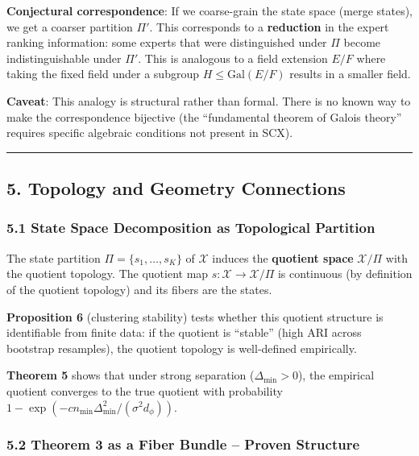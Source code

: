 \documentclass[
  12pt,
]{article}
\begin{document}
\textbf{Conjectural correspondence}: If we coarse-grain the state space
(merge states), we get a coarser partition \(\Pi'\). This corresponds to
a \textbf{reduction} in the expert ranking information: some experts
that were distinguished under \(\Pi\) become indistinguishable under
\(\Pi'\). This is analogous to a field extension \(E/F\) where taking
the fixed field under a subgroup \(H \leq \text{Gal}(E/F)\) results in a
smaller field.

\textbf{Caveat}: This analogy is structural rather than formal. There is
no known way to make the correspondence bijective (the ``fundamental
theorem of Galois theory'' requires specific algebraic conditions not
present in SCX).

\begin{center}\rule{0.5\linewidth}{0.5pt}\end{center}

\subsection{5. Topology and Geometry
Connections}\label{topology-and-geometry-connections}

\subsubsection{5.1 State Space Decomposition as Topological
Partition}\label{state-space-decomposition-as-topological-partition}

The state partition \(\Pi = \{s_1, \dots, s_K\}\) of \(\mathcal{X}\)
induces the \textbf{quotient space} \(\mathcal{X}/\Pi\) with the
quotient topology. The quotient map
\(s: \mathcal{X} \to \mathcal{X}/\Pi\) is continuous (by definition of
the quotient topology) and its fibers are the states.

\textbf{Proposition 6} (clustering stability) tests whether this
quotient structure is identifiable from finite data: if the quotient is
``stable'' (high ARI across bootstrap resamples), the quotient topology
is well-defined empirically.

\textbf{Theorem 5} shows that under strong separation
(\(\Delta_{\min} > 0\)), the empirical quotient converges to the true
quotient with probability
\(1 - \exp(-c n_{\min} \Delta_{\min}^2 / (\sigma^2 d_\phi))\).

\subsubsection{5.2 Theorem 3 as a Fiber Bundle -- Proven
Structure}\label{theorem-3-as-a-fiber-bundle-proven-structure}
\end{document}
